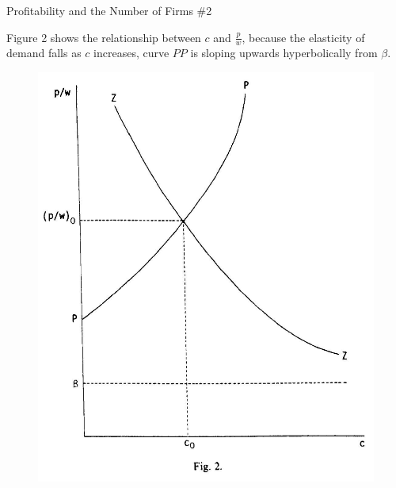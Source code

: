 \documentclass[aspectratio=169]{beamer}
\begin{document}
\begin{frame}{Profitability and the Number of Firms \#2}

Figure 2 shows the relationship between $ c $ and $ \frac{p}{w} $, because the elasticity of demand falls as $ c $ increases, curve $ PP $ is sloping upwards hyperbolically from $ \beta $.
\begin{figure}
     \centering
     \includegraphics[scale=0.13]{KrugmanFig2.jpg}
     \label{fig:figure2}
\end{figure}
    
\end{frame}

\end{document}
